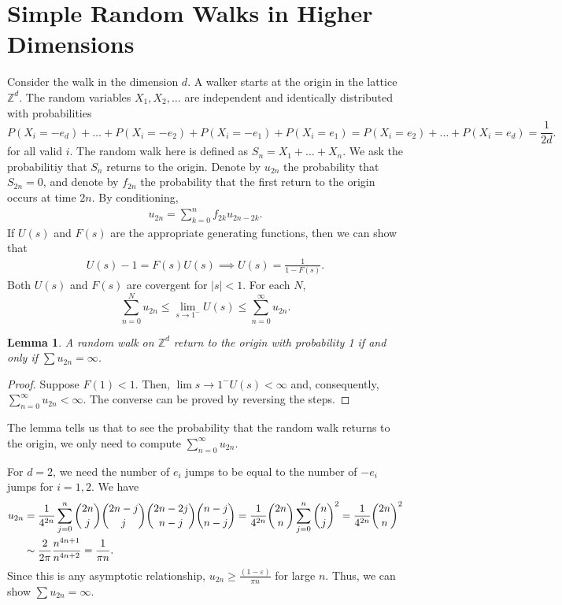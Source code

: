 \documentclass[15pt,a4paper]{book}
\newtheorem{lemma}[theorem]{Lemma}
\theoremstyle{definition}
\newcommand{\abs}[1]{\left| #1 \right|} %
\newcommand{\Z}{\mathbb{Z}}
\begin{document}
\section{Simple Random Walks in Higher Dimensions}
Consider the walk in the dimension $d$. A walker starts at the origin in the lattice $\Z^{d}$. The random variables $X_{1},X_{2},\ldots$ are independent and identically distributed with probabilities
\begin{equation*}
    P(X_{i} = -e_{d}) + \ldots + P(X_{i} = -e_{2}) + P(X_{i} = -e_{1}) + P(X_{i} = e_{1}) = P(X_{i} = e_{2}) + \ldots + P(X_{i} = e_{d}) = \frac{1}{2d}.
\end{equation*}
for all valid $i$. The random walk here is defined as $S_{n} = X_{1} + \ldots + X_{n}$. We ask the probabilitiy that $S_{n}$ returns to the origin. Denote by $u_{2n}$ the probability that $S_{2n} = 0$, and denote by $f_{2n}$ the probability that the first return to the origin occurs at time $2n$. By conditioning,
\begin{align}
    u_{2n} = \sum_{k=0}^{n} f_{2k} u_{2n-2k}.
\end{align}
If $U(s)$ and $F(s)$ are the appropriate generating functions, then we can show that
\begin{align}
    U(s)-1 = F(s)U(s) \implies U(s) = \frac{1}{1-F(s)}.
\end{align}
Both $U(s)$ and $F(s)$ are covergent for $\abs{s} < 1$. For each $N$,
\begin{equation}
    \sum_{n=0}^{N} u_{2n} \leq \lim_{s \to 1^{-}} U(s) \leq \sum_{n=0}^{\infty} u_{2n}.
\end{equation}

\begin{lemma}
    A random walk on $\Z^{d}$ return to the origin with probability 1 if and only if $\sum u_{2n} = \infty$.
\end{lemma}
\begin{proof}
    Suppose $F(1) < 1$. Then, $\lim{s \to 1^{-}} U(s) < \infty$ and, consequently, $\sum_{n=0}^{\infty} u_{2n} < \infty$. The converse can be proved by reversing the steps.
\end{proof}
The lemma tells us that to see the probability that the random walk returns to the origin, we only need to compute $\sum_{n=0}^{\infty} u_{2n}$.

For $d = 2$, we need the number of $e_{i}$ jumps to be equal to the number of $-e_{i}$ jumps for $i = 1,2$. We have
\begin{align}
    u_{2n} &= \frac{1}{4^{2n}} \sum_{j=0}^{n} \binom{2n}{j} \binom{2n-j}{j} \binom{2n-2j}{n-j} \binom{n-j}{n-j} = \frac{1}{4^{2n}} \binom{2n}{n} \sum_{j=0}^{n} \binom{n}{j}^{2} = \frac{1}{4^{2n}} \binom{2n}{n}^{2} \notag \\
    &\sim \frac{2}{2\pi} \frac{n^{4n+1}}{n^{4n+2}} = \frac{1}{\pi n}.
\end{align}
Since this is any asymptotic relationship, $u_{2n} \geq \frac{(1-\varepsilon)}{\pi n}$ for large $n$. Thus, we can show $\sum u_{2n} = \infty$.
\end{document}
